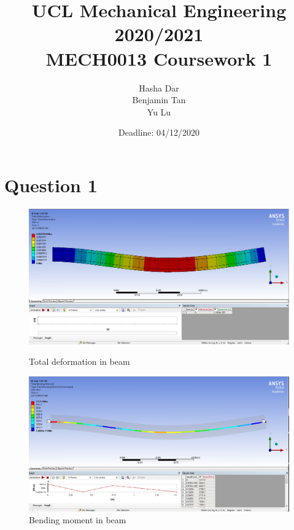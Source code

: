 \documentclass[11pt]{article}
\numberwithin{equation}{section}
\begin{document}
\title{\textbf{UCL Mechanical Engineering 2020/2021}\\MECH0013 Coursework 1}
\date{Deadline: 04/12/2020}
\author{Hasha Dar\\
Benjamin Tan\\
Yu Lu}
\maketitle
\tableofcontents
\newpage
\section{Question 1}
\begin{figure}[H]
  \centering
  \begin{minipage}[b]{0.49\textwidth}
    \includegraphics[width=\textwidth]{./img/TotalDeformationQ1.png}
    \caption{Total deformation in beam}
  \end{minipage}
  \hfill
  \begin{minipage}[b]{0.49\textwidth}
    \includegraphics[width=\textwidth]{./img/BendingMomentQ1.png}
    \caption{Bending moment in beam}
  \end{minipage}
\end{figure}
\end{document}
